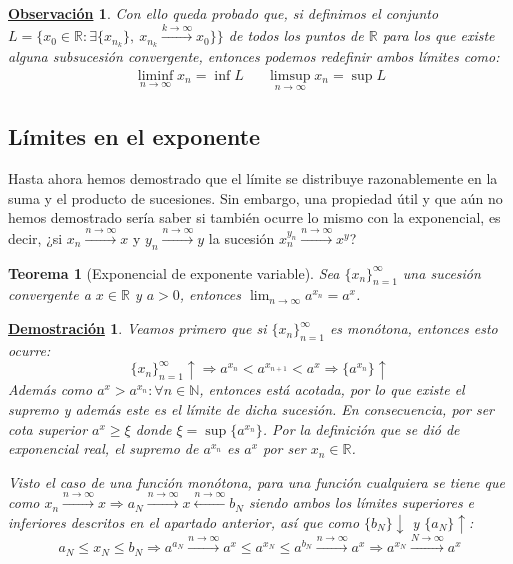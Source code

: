\documentclass[10pt,a4paper,openright]{book}
\theoremstyle{break}
\newtheorem{theo}{Teorema}[chapter]
\newtheorem*{demo}{\underline{Demostración}}
\newtheorem{obs}{\underline{Observación}}[chapter]
\begin{document}
\begin{obs}
Con ello queda probado que, si definimos el conjunto $L=\{x_0\in \mathbb R: \exists \{x_{n_k}\}, \ x_{n_k}\xrightarrow{k\rightarrow \infty} x_0\}\}$ de todos los puntos de $\mathbb{R}$ para los que existe alguna subsucesión convergente, entonces podemos redefinir ambos límites como:
\begin{align*}
\liminf_{n\rightarrow\infty}x_n=\inf L && \limsup_{n\rightarrow\infty}x_n=\sup L
\end{align*}
\end{obs}

\subsection{Límites en el exponente}
Hasta ahora hemos demostrado que el límite se distribuye razonablemente en la suma y el producto de sucesiones. Sin embargo, una propiedad útil y que aún no hemos demostrado sería saber si también ocurre lo mismo con la exponencial, es decir, ¿si $x_n \xrightarrow{n\rightarrow \infty} x$ y $y_n \xrightarrow{n\rightarrow \infty} y$ la sucesión $x_n^{y_n} \xrightarrow{n\rightarrow \infty} x^y$?

\begin{theo}[Exponencial de exponente variable]
Sea $\{x_n\}_{n=1}^\infty$ una sucesión convergente a $x\in \mathbb{R}$ y $a>0$, entonces $\lim_{n\rightarrow\infty} a^{x_n}=a^x$.
\end{theo}
\begin{demo}
Veamos primero que si $\{x_n\}_{n=1}^\infty$ es monótona, entonces esto ocurre:
$$\{x_n\}_{n=1}^\infty\uparrow\Rightarrow a^{x_n}<a^{x_{n+1}}<a^x \Rightarrow \{a^{x_n}\} \uparrow$$
Además como $a^x>a^{x_n}:\forall n\in \mathbb N$, entonces está acotada, por lo que existe el supremo y además este es el límite de dicha sucesión. En consecuencia, por ser cota superior $a^x\geq \xi$ donde $\xi=\sup\{a^{x_n}\}$. Por la definición que se dió de exponencial real, el supremo de $a^{x_n}$ es $a^x$ por ser $x_n\in \mathbb R$.

Visto el caso de una función monótona, para una función cualquiera se tiene que como $x_n\xrightarrow{n\rightarrow\infty} x\Rightarrow a_N\xrightarrow{n\rightarrow\infty}x\xleftarrow{n\rightarrow\infty} b_N$ siendo ambos los límites superiores e inferiores descritos en el apartado anterior, así que como $\{b_N\}\downarrow$ y $\{a_N\}\uparrow$:
$$a_N\leq x_N\leq b_N \Rightarrow a^{a_N}\xrightarrow{n\rightarrow\infty}a^x\leq a^{x_N}\leq a^{b_N}\xrightarrow{n\rightarrow\infty}a^x\Rightarrow a^{x_N}\xrightarrow{N\rightarrow\infty}a^x$$
\end{demo}
\end{document}
